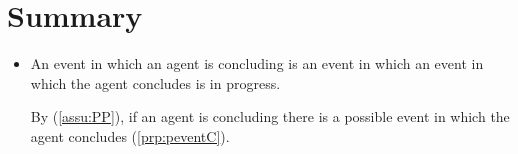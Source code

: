 \section*{Summary}
\label{sec:summary}


\begin{note}
  \begin{itemize}
  \item
    An event in which an agent is concluding is an event in which an event in which the agent concludes is in progress.

    By \assuPP{} (\autoref{assu:PP}), if an agent is concluding there is a possible event in which the agent concludes (\autoref{prp:peventC}).

  \end{itemize}
\end{note}



